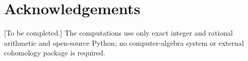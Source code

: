 \documentclass[11pt,a4paper]{article}
\theoremstyle{plain}
\theoremstyle{definition}
\theoremstyle{remark}
\begin{document}
\setcounter{tocdepth}{1}
\tableofcontents
\bigskip















\appendix



\section*{Acknowledgements}
[To be completed.] The computations use only exact integer and rational
arithmetic and open-source Python; no computer-algebra system or external
cohomology package is required.



\end{document}
